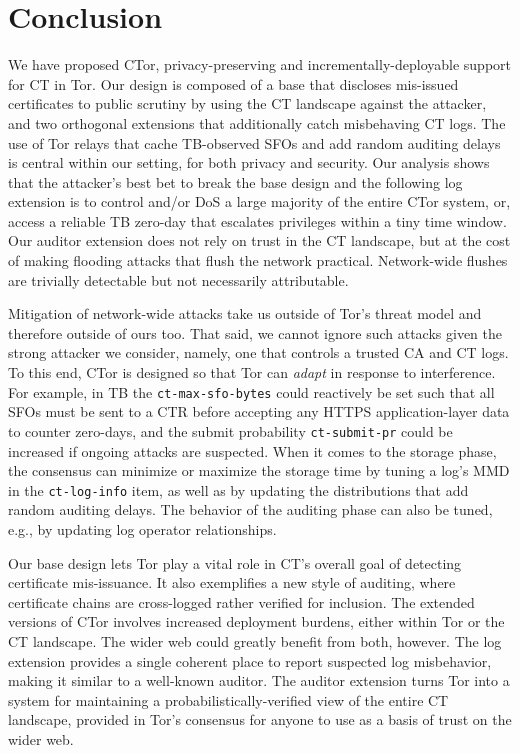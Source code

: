 \section{Conclusion} \label{sec:conclusion}

We have proposed CTor, privacy-preserving and incrementally-deployable
support for CT in
Tor.  Our design is composed of a base that discloses mis-issued
certificates to public scrutiny by using the CT landscape against the attacker,
and two orthogonal extensions that additionally catch misbehaving CT logs.  The
use of Tor relays that cache TB-observed SFOs and add random auditing delays is
central within our setting, for both privacy and security.  Our analysis shows
that the attacker's best bet to break the base design and the following log
extension is to control and/or DoS a large majority of the entire CTor system,
or, access a reliable TB zero-day that escalates privileges within a tiny time
window.  Our auditor extension does not rely on trust in the CT landscape, but
at the cost of making flooding attacks that flush the network practical.
Network-wide flushes are trivially detectable but not necessarily attributable.

Mitigation of network-wide attacks take us outside of Tor's threat model and
therefore outside of ours too.  That said, we cannot ignore such attacks given
the strong attacker we consider, namely, one that controls a trusted CA and
CT logs.  To this end, CTor is designed so that Tor can \emph{adapt} in response
to interference.  For example, in TB the \texttt{ct-max-sfo-bytes} could
reactively be set such that all SFOs must be sent to a CTR before accepting any
HTTPS application-layer data to counter zero-days, and the submit probability
\texttt{ct-submit-pr} could be increased if ongoing attacks are suspected.  When
it comes to the storage phase, the consensus can minimize or maximize the
storage time by tuning a log's MMD in the \texttt{ct-log-info} item, as well as
by updating the distributions that add random auditing delays.  
The behavior of the
auditing phase can also be tuned, e.g., by updating log operator relationships.

Our base design lets Tor play a vital role in CT's overall goal of detecting
certificate mis-issuance.  It also exemplifies a new style of auditing, where
certificate chains are cross-logged rather verified for inclusion.  The extended
versions of CTor involves increased deployment burdens, either within Tor or the
CT landscape.  The wider web could greatly benefit from both, however.  The log
extension provides a single coherent place to report suspected log misbehavior,
making it similar to a well-known auditor.  The auditor extension turns Tor into
a system for maintaining a probabilistically-verified view of the entire CT
landscape, provided in Tor's consensus for anyone to use as a basis of trust on
the wider web.

